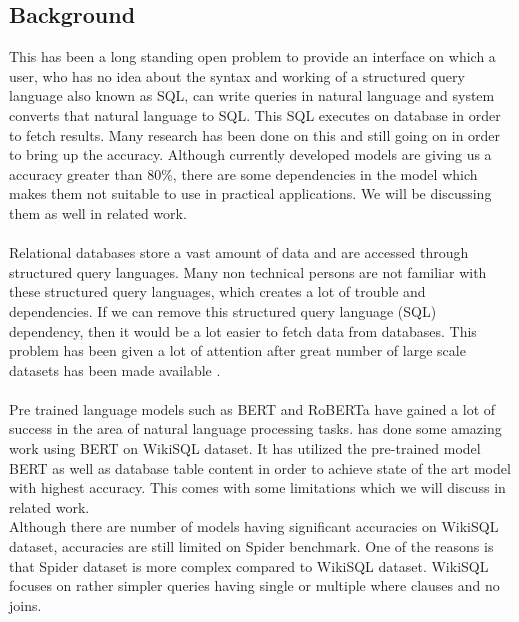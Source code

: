 \documentclass[12pt]{article}
\begin{document}
\subsection{Background}
This has been a long standing open problem to provide an interface on which a user, who has no idea about the syntax and working of a structured query language also known as SQL, can write queries in natural language and system converts that natural language to SQL. This SQL executes on database in order to fetch results. Many research has been done on this and still going on in order to bring up the accuracy. Although currently developed models are giving us a accuracy greater than 80\%, there are some dependencies in the model which makes them not suitable to use in practical applications. We will be discussing them as well in related work.
\\ \\
 Relational databases store a vast amount of data and are accessed through structured query languages. Many non technical persons are not familiar with these structured query languages, which creates a lot of trouble and dependencies. If we can remove this structured query language (SQL) dependency, then it would be a lot easier to fetch data from databases. This problem has been given a lot of attention after great number of  large scale datasets has been made available \cite{zhong2017seq2sql} \cite{setlur2019inferencing} \cite{yu2018spider}. 
\\ \\
Pre trained language models such as BERT \cite{devlin2018bert} and RoBERTa \cite{liu2019roberta}  have gained a lot of success in the area of natural language processing tasks. \cite{guo2019content} has done some amazing work using BERT on WikiSQL dataset. It has utilized the pre-trained model BERT as well as database table content in order to achieve state of the art model with highest accuracy. This comes with some limitations which we will discuss in related work. 
\\Although there are number of models having significant accuracies on WikiSQL dataset, accuracies are still limited on Spider benchmark\cite{yu2018spider}. One of the reasons is that Spider dataset is more complex compared to WikiSQL dataset. WikiSQL focuses on rather simpler queries having single or multiple where clauses and no joins.\\\\\\
\end{document}
